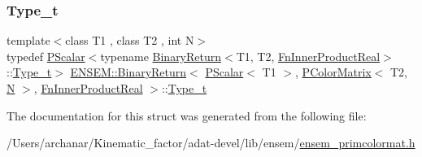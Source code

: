 \subsubsection{\texorpdfstring{Type\_t}{Type\_t}\hspace{0.1cm}{\footnotesize\ttfamily [3/3]}}
{\footnotesize\ttfamily template$<$class T1 , class T2 , int N$>$ \\
typedef \mbox{\hyperlink{classENSEM_1_1PScalar}{P\+Scalar}}$<$typename \mbox{\hyperlink{structENSEM_1_1BinaryReturn}{Binary\+Return}}$<$T1, T2, \mbox{\hyperlink{structENSEM_1_1FnInnerProductReal}{Fn\+Inner\+Product\+Real}}$>$\+::\mbox{\hyperlink{structENSEM_1_1BinaryReturn_3_01PScalar_3_01T1_01_4_00_01PColorMatrix_3_01T2_00_01N_01_4_00_01FnInnerProductReal_01_4_a11d39ff117f9fcafe7d0812201c9c496}{Type\+\_\+t}}$>$ \mbox{\hyperlink{structENSEM_1_1BinaryReturn}{E\+N\+S\+E\+M\+::\+Binary\+Return}}$<$ \mbox{\hyperlink{classENSEM_1_1PScalar}{P\+Scalar}}$<$ T1 $>$, \mbox{\hyperlink{classENSEM_1_1PColorMatrix}{P\+Color\+Matrix}}$<$ T2, \mbox{\hyperlink{adat__devel_2lib_2hadron_2operator__name__util_8cc_a7722c8ecbb62d99aee7ce68b1752f337}{N}} $>$, \mbox{\hyperlink{structENSEM_1_1FnInnerProductReal}{Fn\+Inner\+Product\+Real}} $>$\+::\mbox{\hyperlink{structENSEM_1_1BinaryReturn_3_01PScalar_3_01T1_01_4_00_01PColorMatrix_3_01T2_00_01N_01_4_00_01FnInnerProductReal_01_4_a11d39ff117f9fcafe7d0812201c9c496}{Type\+\_\+t}}}



The documentation for this struct was generated from the following file\+:\begin{DoxyCompactItemize}
\item 
/\+Users/archanar/\+Kinematic\+\_\+factor/adat-\/devel/lib/ensem/\mbox{\hyperlink{adat-devel_2lib_2ensem_2ensem__primcolormat_8h}{ensem\+\_\+primcolormat.\+h}}\end{DoxyCompactItemize}
